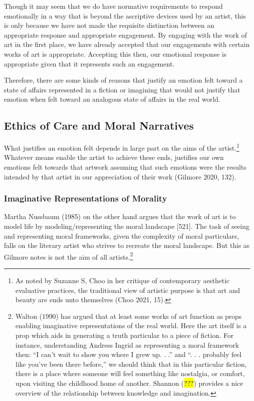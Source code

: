 \documentclass[
  letterpaper,
  DIV=11,
  numbers=noendperiod]{scrartcl}
\theoremstyle{remark}
\begin{document}
Though it may seem that we do have normative requirements to respond
emotionally in a way that is beyond the ascriptive devices used by an
artist, this is only because we have not made the requisite distinction
between an appropriate response and appropriate engagement. By engaging
with the work of art in the first place, we have already accepted that
our engagements with certain works of art is appropriate. Accepting this
then, our emotional response is appropriate given that it represents
such an engagement.

Therefore, there are some kinds of reasons that justify an emotion felt
toward a state of affairs represented in a fiction or imagining that
would not justify that emotion when felt toward an analogous state of
affairs in the real world.

\subsection{Ethics of Care and Moral
Narratives}\label{ethics-of-care-and-moral-narratives}

What justifies an emotion felt depends in large part on the aims of the
artist.\footnote{As noted by Suzanne S, Choo in her critique of
  contemporary aesthetic evaluative practices, the traditional view of
  artistic purpose is that art and beauty are ends unto themselves (Choo
  2021, 15).} Whatever means enable the artist to achieve these ends,
justifies our own emotions felt towards that artwork assuming that such
emotions were the results intended by that artist in our appreciation of
their work (Gilmore 2020, 132).

\subsubsection{Imaginative Representations of
Morality}\label{imaginative-representations-of-morality}

Martha Nussbaum (1985) on the other hand argues that the work of art is
to model life by modeling/representing the moral landscape {[}521{]}.
The task of seeing and representing moral frameworks, given the
complexity of moral particulars, falls on the literary artist who
strives to recreate the moral landscape. But this as Gilmore notes is
not the aim of all artists.\footnote{Walton (1990) has argued that at
  least some works of art function as props enabling imaginative
  representations of the real world. Here the art itself is a prop which
  aids in generating a truth particular to a piece of fiction. For
  instance, understanding Andress Ingrid as representing a moral
  framework then: ``I can't wait to show you where I grew up. . .'' and
  ``. . . probably feel like you've been there before,'' we should think
  that in this particular fiction, there is a place where someone will
  feel something like nostalgia, or comfort, upon visiting the childhood
  home of another. Shannon (\hl{???}) provides a nice overview of the
  relationship between knowledge and imagination.}
\end{document}

